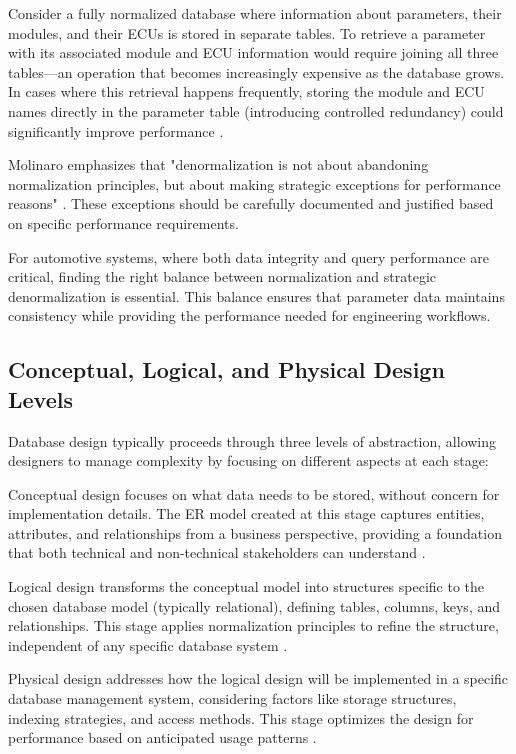 Consider a fully normalized database where information about parameters, their modules, and their \acp{ECU} is stored in separate tables. To retrieve a parameter with its associated module and \ac{ECU} information would require joining all three tables—an operation that becomes increasingly expensive as the database grows. In cases where this retrieval happens frequently, storing the module and \ac{ECU} names directly in the parameter table (introducing controlled redundancy) could significantly improve performance \cite{schwartz2012high}.

Molinaro emphasizes that "denormalization is not about abandoning normalization principles, but about making strategic exceptions for performance reasons" \cite{molinaro2005sql}. These exceptions should be carefully documented and justified based on specific performance requirements.

For automotive systems, where both data integrity and query performance are critical, finding the right balance between normalization and strategic denormalization is essential. This balance ensures that parameter data maintains consistency while providing the performance needed for engineering workflows.

\subsection{Conceptual, Logical, and Physical Design Levels}
\label{subsec:design-levels}

Database design typically proceeds through three levels of abstraction, allowing designers to manage complexity by focusing on different aspects at each stage:

Conceptual design focuses on what data needs to be stored, without concern for implementation details. The ER model created at this stage captures entities, attributes, and relationships from a business perspective, providing a foundation that both technical and non-technical stakeholders can understand \cite{elmasri2015fundamentals}.

Logical design transforms the conceptual model into structures specific to the chosen database model (typically relational), defining tables, columns, keys, and relationships. This stage applies normalization principles to refine the structure, independent of any specific database system \cite{elmasri2015fundamentals}.

Physical design addresses how the logical design will be implemented in a specific database management system, considering factors like storage structures, indexing strategies, and access methods. This stage optimizes the design for performance based on anticipated usage patterns \cite{obe2017postgresql}.

